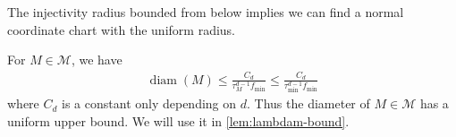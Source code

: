 The injectivity radius bounded from below implies we can find a normal coordinate chart with the uniform radius.

\begin{corollary}[Diameter]\cite[Lem. 2]{aamari2018stability}
	For $M \in \mathcal{M}$, we have
	\begin{align}
		\operatorname{diam}(M)\leq \frac{C_d}{\tau_M^{d-1}f_{\min}}\leq \frac{C_d}{\tau_{\min}^{d-1}f_{\min}}
	\end{align}
	where $C_d$ is a constant only depending on $d$. Thus the diameter of $M \in \mathcal{M}$ has a uniform upper bound. We will use it in \cref{lem:lambdam-bound}.
\end{corollary}


